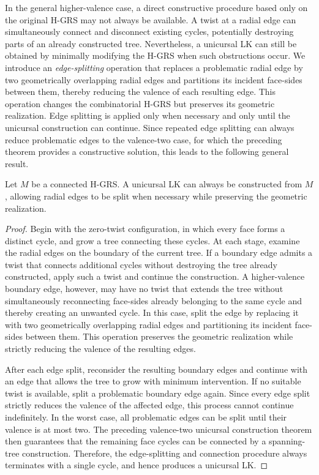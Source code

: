 \documentclass[acmtog]{acmart}
\begin{document}
In the general higher-valence case, a direct constructive procedure based only on the original H-GRS may not always be available. A twist at a radial edge can simultaneously connect and disconnect existing cycles, potentially destroying parts of an already constructed tree. Nevertheless, a unicursal LK can still be obtained by minimally modifying the H-GRS when such obstructions occur. We introduce an \emph{edge-splitting} operation that replaces a problematic radial edge by two geometrically overlapping radial edges and partitions its incident face-sides between them, thereby reducing the valence of each resulting edge. This operation changes the combinatorial H-GRS but preserves its geometric realization. Edge splitting is applied only when necessary and only until the unicursal construction can continue. Since repeated edge splitting can always reduce problematic edges to the valence-two case, for which the preceding theorem provides a constructive solution, this leads to the following general result.

\begin{theorem} Let $M$ be a connected H-GRS. A unicursal LK can always be constructed from $M$, allowing radial edges to be split when necessary while preserving the geometric realization. \end{theorem}

\begin{proof} Begin with the zero-twist configuration, in which every face forms a distinct cycle, and grow a tree connecting these cycles. At each stage, examine the radial edges on the boundary of the current tree. If a boundary edge admits a twist that connects additional cycles without destroying the tree already constructed, apply such a twist and continue the construction. A higher-valence boundary edge, however, may have no twist that extends the tree without simultaneously reconnecting face-sides already belonging to the same cycle and thereby creating an unwanted cycle. In this case, split the edge by replacing it with two geometrically overlapping radial edges and partitioning its incident face-sides between them. This operation preserves the geometric realization while strictly reducing the valence of the resulting edges.

After each edge split, reconsider the resulting boundary edges and continue with an edge that allows the tree to grow with minimum intervention. If no suitable twist is available, split a problematic boundary edge again. Since every edge split strictly reduces the valence of the affected edge, this process cannot continue indefinitely. In the worst case, all problematic edges can be split until their valence is at most two. The preceding valence-two unicursal construction theorem then guarantees that the remaining face cycles can be connected by a spanning-tree construction. Therefore, the edge-splitting and connection procedure always terminates with a single cycle, and hence produces a unicursal LK. \end{proof}
\end{document}
